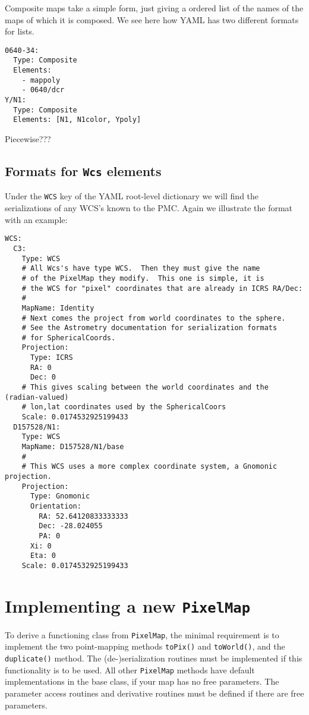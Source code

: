 \documentclass[11pt,preprint,flushrt]{aastex}
\begin{document}
Composite maps take a simple form, just giving a ordered list of the names of the maps of which it is composed.  We see here how YAML has two different formats for lists.
\begin{verbatim}
0640-34:
  Type: Composite
  Elements:
    - mappoly
    - 0640/dcr
Y/N1:
  Type: Composite
  Elements: [N1, N1color, Ypoly]
\end{verbatim}

Piecewise???

\subsection{Formats for \texttt{Wcs} elements}
\label{wcsserial}
Under the \texttt{WCS} key of the YAML root-level dictionary we will find the serializations of any WCS's known to the PMC.  Again we illustrate the format with an example:
\begin{verbatim}
WCS:
  C3:
    Type: WCS
    # All Wcs's have type WCS.  Then they must give the name
    # of the PixelMap they modify.  This one is simple, it is
    # the WCS for "pixel" coordinates that are already in ICRS RA/Dec:
    #
    MapName: Identity
    # Next comes the project from world coordinates to the sphere.
    # See the Astrometry documentation for serialization formats
    # for SphericalCoords.
    Projection:
      Type: ICRS
      RA: 0
      Dec: 0
    # This gives scaling between the world coordinates and the (radian-valued)
    # lon,lat coordinates used by the SphericalCoors
    Scale: 0.0174532925199433
  D157528/N1:
    Type: WCS
    MapName: D157528/N1/base
    # 
    # This WCS uses a more complex coordinate system, a Gnomonic projection.
    Projection:
      Type: Gnomonic
      Orientation:
        RA: 52.64120833333333
        Dec: -28.024055
        PA: 0
      Xi: 0
      Eta: 0
    Scale: 0.0174532925199433
\end{verbatim}

\section{Implementing a new {\tt PixelMap}}
To derive a functioning class from {\tt PixelMap}, the minimal requirement is to implement the two point-mapping methods {\tt toPix()} and {\tt toWorld()}, and the {\tt duplicate()} method.  The (de-)serialization  routines must be implemented if this functionality is to be used. 
All other {\tt PixelMap} methods have default implementations in the base class, if your map has no free parameters.  The parameter access routines and derivative routines must be defined if there are free parameters. 
\end{document}
